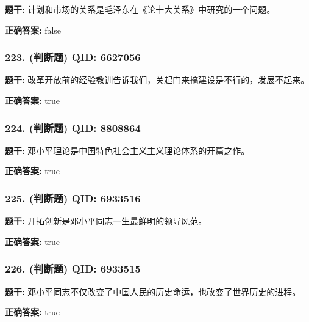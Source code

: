 \documentclass[12pt,UTF8]{ctexart}
\begin{document}
\textbf{题干:}
计划和市场的关系是毛泽东在《论十大关系》中研究的一个问题。

\textbf{正确答案:}
false

\vspace{0.3em}\hrulefill\vspace{0.7em}

\subsubsection*{223. (判断题) \small QID: 6627056}

\textbf{题干:}
改革开放前的经验教训告诉我们，关起门来搞建设是不行的，发展不起来。

\textbf{正确答案:}
true

\vspace{0.3em}\hrulefill\vspace{0.7em}

\subsubsection*{224. (判断题) \small QID: 8808864}

\textbf{题干:}
邓小平理论是中国特色社会主义主义理论体系的开篇之作。

\textbf{正确答案:}
true

\vspace{0.3em}\hrulefill\vspace{0.7em}

\subsubsection*{225. (判断题) \small QID: 6933516}

\textbf{题干:}
开拓创新是邓小平同志一生最鲜明的领导风范。

\textbf{正确答案:}
true

\vspace{0.3em}\hrulefill\vspace{0.7em}

\subsubsection*{226. (判断题) \small QID: 6933515}

\textbf{题干:}
邓小平同志不仅改变了中国人民的历史命运，也改变了世界历史的进程。

\textbf{正确答案:}
true

\vspace{0.3em}\hrulefill\vspace{0.7em}
\end{document}
